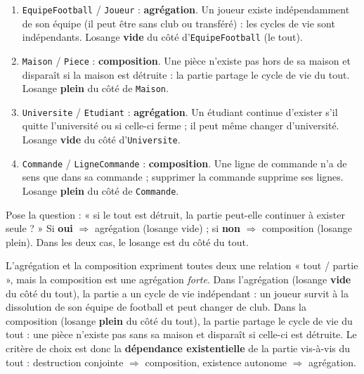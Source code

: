 \documentclass[11pt]{article}
\begin{document}
\begin{corrige}
\begin{enumerate}
  \item \texttt{EquipeFootball} / \texttt{Joueur} : \textbf{agrégation}. Un joueur existe indépendamment de son équipe (il peut être sans club ou transféré) : les cycles de vie sont indépendants. Losange \textbf{vide} du côté d'\texttt{EquipeFootball} (le tout).
  \item \texttt{Maison} / \texttt{Piece} : \textbf{composition}. Une pièce n'existe pas hors de sa maison et disparaît si la maison est détruite : la partie partage le cycle de vie du tout. Losange \textbf{plein} du côté de \texttt{Maison}.
  \item \texttt{Universite} / \texttt{Etudiant} : \textbf{agrégation}. Un étudiant continue d'exister s'il quitte l'université ou si celle-ci ferme ; il peut même changer d'université. Losange \textbf{vide} du côté d'\texttt{Universite}.
  \item \texttt{Commande} / \texttt{LigneCommande} : \textbf{composition}. Une ligne de commande n'a de sens que dans sa commande ; supprimer la commande supprime ses lignes. Losange \textbf{plein} du côté de \texttt{Commande}.
\end{enumerate}
\end{corrige}

\begin{methode}
Pose la question : « si le tout est détruit, la partie peut-elle continuer à exister seule ? » Si \textbf{oui} $\Rightarrow$ agrégation (losange vide) ; si \textbf{non} $\Rightarrow$ composition (losange plein). Dans les deux cas, le losange est du côté du tout.
\end{methode}

\begin{corrige}
L'agrégation et la composition expriment toutes deux une relation « tout / partie », mais la composition est une agrégation \emph{forte}. Dans l'agrégation (losange \textbf{vide} du côté du tout), la partie a un cycle de vie indépendant : un joueur survit à la dissolution de son équipe de football et peut changer de club. Dans la composition (losange \textbf{plein} du côté du tout), la partie partage le cycle de vie du tout : une pièce n'existe pas sans sa maison et disparaît si celle-ci est détruite. Le critère de choix est donc la \textbf{dépendance existentielle} de la partie vis-à-vis du tout : destruction conjointe $\Rightarrow$ composition, existence autonome $\Rightarrow$ agrégation.
\end{corrige}
\end{document}
